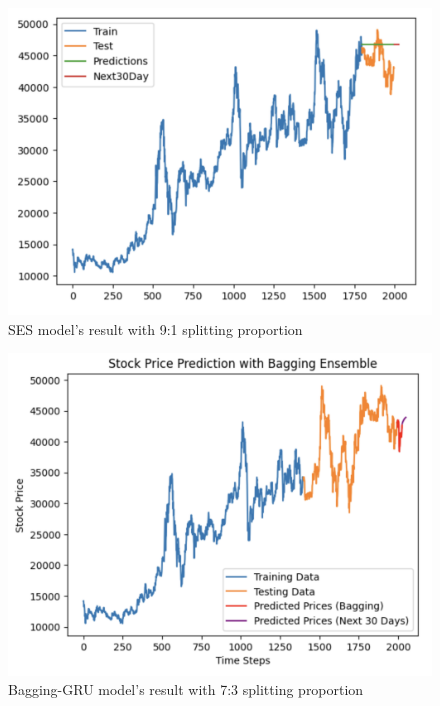 \documentclass{ieeeojies}
\begin{document}
\begin{figure}[H]
  \centering
  \begin{minipage}{0.8\linewidth}
    \centering
        \includegraphics[width=\linewidth]{bibliography/ETS_BIDV91.png}
    \caption{SES model's result with 9:1 splitting proportion}
    \label{fig28}
  \end{minipage}
\end{figure}
\begin{figure}[H]
  \centering
  \begin{minipage}{0.8\linewidth}
    \centering
        \includegraphics[width=\linewidth]{bibliography/baggingGRU_BIDV.png}
    \caption{Bagging-GRU model's result with 7:3 splitting proportion}
    \label{fig28}
  \end{minipage}
\end{figure}
\end{document}
